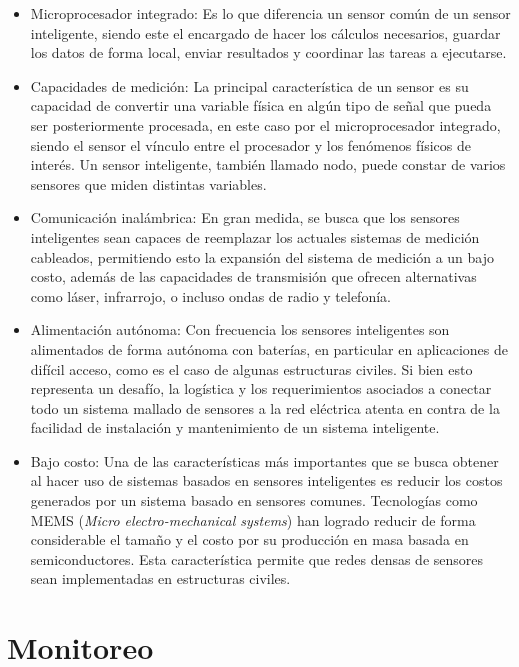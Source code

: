 \begin{itemize}
    \item Microprocesador integrado: Es lo que diferencia un sensor común de un sensor inteligente, siendo este el encargado de hacer los cálculos necesarios, guardar los datos de forma local, enviar resultados y coordinar las tareas a ejecutarse. 
    
    \item Capacidades de medición: La principal característica de un sensor es su capacidad de convertir una variable física en algún tipo de señal que pueda ser posteriormente procesada, en este caso por el microprocesador integrado, siendo el sensor el vínculo entre el procesador y los fenómenos físicos de interés. Un sensor inteligente, también llamado nodo, puede constar de varios sensores que miden distintas variables.
    
    \item Comunicación inalámbrica: En gran medida, se busca que los sensores inteligentes sean capaces de reemplazar los actuales sistemas de medición cableados, permitiendo esto la expansión del sistema de medición a un bajo costo, además de las capacidades de transmisión que ofrecen alternativas como láser, infrarrojo, o incluso ondas de radio y telefonía.
    
    \item Alimentación autónoma: Con frecuencia los sensores inteligentes son alimentados de forma autónoma con baterías, en particular en aplicaciones de difícil acceso, como es el caso de algunas estructuras civiles. Si bien esto representa un desafío, la logística y los requerimientos asociados a conectar todo un sistema mallado de sensores a la red eléctrica atenta en contra de la facilidad de instalación y mantenimiento de un sistema inteligente.
    
    \item Bajo costo: Una de las características más importantes que se busca obtener al hacer uso de sistemas basados en sensores inteligentes es reducir los costos generados por un sistema basado en sensores comunes. Tecnologías como MEMS (\textit{Micro electro-mechanical systems}) han logrado reducir de forma considerable el tamaño y el costo por su producción en masa basada en semiconductores. Esta característica permite que redes densas de sensores sean implementadas en estructuras civiles.
\end{itemize}


\section{Monitoreo}

